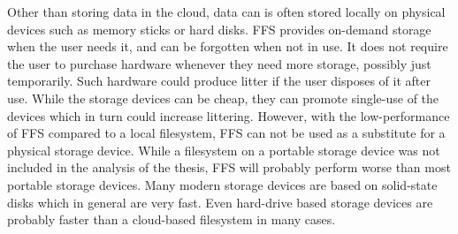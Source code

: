 Other than storing data in the cloud, data can is often stored locally on physical devices such as memory sticks or hard disks. \gls{FFS} provides \mbox{on-demand} storage when the user needs it, and can be forgotten when not in use. It does not require the user to purchase hardware whenever they need more storage, possibly just temporarily. Such hardware could produce litter if the user disposes of it after use. While the storage devices can be cheap, they can promote \mbox{single-use} of the devices which in turn could increase littering. However, with the low-performance of \gls{FFS} compared to a local filesystem, \gls{FFS} can not be used as a substitute for a physical storage device. While a filesystem on a portable storage device was not included in the analysis of the thesis, \gls{FFS} will probably perform worse than most portable storage devices. Many modern storage devices are based on solid-state disks which in general are very fast. Even hard-drive based storage devices are probably faster than a \mbox{cloud-based} filesystem in many cases.

